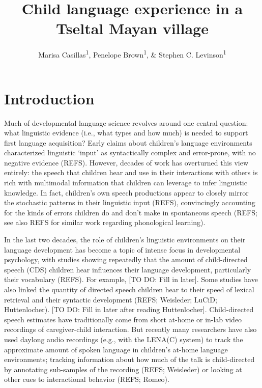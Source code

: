 \documentclass[man]{apa6}
\title{Child language experience in a Tseltal Mayan village}
\author{Marisa Casillas\textsuperscript{1}, Penelope Brown\textsuperscript{1}, \& Stephen C. Levinson\textsuperscript{1}}
\affiliation{
    \vspace{0.5cm}
          \textsuperscript{1} Max Planck Institute for Psycholinguistics  }
\theoremstyle{definition}
\theoremstyle{definition}
\theoremstyle{definition}
\theoremstyle{remark}
\begin{document}
\maketitle

\setcounter{secnumdepth}{0}



\section{Introduction}\label{introduction}

Much of developmental language science revolves around one central
question: what linguistic evidence (i.e., what types and how much) is
needed to support first language acquisition? Early claims about
children's language environments characterized linguistic `input' as
syntactically complex and error-prone, with no negative evidence (REFS).
However, decades of work has overturned this view entirely: the speech
that children hear and use in their interactions with others is rich
with multimodal information that children can leverage to infer
linguistic knowledge. In fact, children's own speech productions appear
to closely mirror the stochastic patterns in their linguistic input
(REFS), convincingly accounting for the kinds of errors children do and
don't make in spontaneous speech (REFS; see also REFS for similar work
regarding phonological learning).

In the last two decades, the role of children's linguistic environments
on their language development has become a topic of intense focus in
developmental psychology, with studies showing repeatedly that the
amount of child-directed speech (CDS) children hear influences their
language development, particularly their vocabulary (REFS). For example,
{[}TO DO: Fill in later{]}. Some studies have also linked the quantity
of directed speech children hear to their speed of lexical retrieval and
their syntactic development (REFS; Weisleder; LuCiD; Huttenlocher).
{[}TO DO: Fill in later after reading Huttenlocher{]}. Child-directed
speech estimates have traditionally come from short at-home or in-lab
video recordings of caregiver-child interaction. But recently many
researchers have also used daylong audio recordings (e.g., with the
LENA(C) system) to track the approximate amount of spoken language in
children's at-home language environments; tracking information about how
much of the talk is child-directed by annotating sub-samples of the
recording (REFS; Weisleder) or looking at other cues to interactional
behavior (REFS; Romeo).
\end{document}
